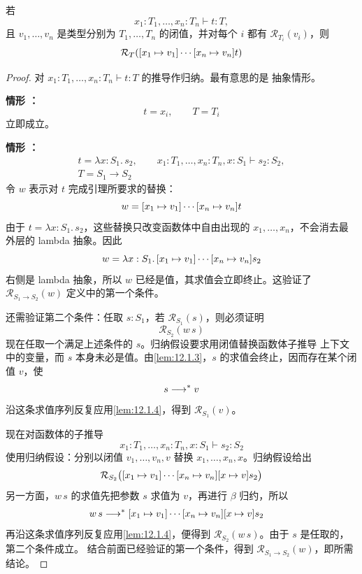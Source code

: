 \begin{lemma}
\label{lem:12.1.5}
若
\[
x_1:T_1,\ldots,x_n:T_n\vdash t:T,
\]
且 \(v_1,\ldots,v_n\) 是类型分别为 \(T_1,\ldots,T_n\) 的闭值，并对每个
\(i\) 都有 \(\mathcal R_{T_i}(v_i)\)，则
\[
\mathcal R_T(
  [x_1\mapsto v_1]\cdots
    [x_n\mapsto v_n]t)
\]
\end{lemma}

\begin{proof}
对 \(x_1:T_1,\ldots,x_n:T_n\vdash t:T\) 的推导作归纳。最有意思的是
抽象情形。

\medskip\noindent
\textbf{情形 ：}
\[
t=x_i,\qquad T=T_i
\]
立即成立。

\medskip\noindent
\textbf{情形 ：}
\[
\begin{gathered}
t=\lambda x:S_1.\,s_2,\qquad
x_1:T_1,\ldots,x_n:T_n,x:S_1\vdash s_2:S_2,\\
T=S_1\to S_2
\end{gathered}
\]
令 \(w\) 表示对 \(t\) 完成引理所要求的替换：
\[
w=
[x_1\mapsto v_1]\cdots
 [x_n\mapsto v_n]t
\]
由于 \(t=\lambda x:S_1.\,s_2\)，这些替换只改变函数体中自由出现的
\(x_1,\ldots,x_n\)，不会消去最外层的 lambda 抽象。因此
\[
w=
\lambda x:S_1.\,
[x_1\mapsto v_1]\cdots
 [x_n\mapsto v_n]s_2
\]
右侧是 lambda 抽象，所以 \(w\) 已经是值，其求值会立即终止。这验证了
\(\mathcal R_{S_1\to S_2}(w)\) 定义中的第一个条件。

还需验证第二个条件：任取 \(s:S_1\)，若
\(\mathcal R_{S_1}(s)\)，则必须证明
\[
\mathcal R_{S_2}(w\,s)
\]
现在任取一个满足上述条件的 \(s\)。归纳假设要求用闭值替换函数体子推导
上下文中的变量，而 \(s\) 本身未必是值。由\cref{lem:12.1.3}，\(s\)
的求值会终止，因而存在某个闭值 \(v\)，使
\[
s\mathrel{\longrightarrow^{*}} v
\]
沿这条求值序列反复应用\cref{lem:12.1.4}，得到
\(\mathcal R_{S_1}(v)\)。

现在对函数体的子推导
\[
x_1:T_1,\ldots,x_n:T_n,x:S_1\vdash s_2:S_2
\]
使用归纳假设：分别以闭值 \(v_1,\ldots,v_n,v\) 替换
\(x_1,\ldots,x_n,x\)。归纳假设给出
\[
\mathcal R_{S_2}\bigl(
[x_1\mapsto v_1]\cdots
 [x_n\mapsto v_n]
  [x\mapsto v]s_2\bigr)
\]
另一方面，\(w\,s\) 的求值先把参数 \(s\) 求值为 \(v\)，再进行
\(\beta\) 归约，所以
\[
\begin{aligned}
w\,s
&\mathrel{\longrightarrow^{*}}
[x_1\mapsto v_1]\cdots
 [x_n\mapsto v_n]
  [x\mapsto v]s_2
\end{aligned}
\]
再沿这条求值序列反复应用\cref{lem:12.1.4}，便得到
\(\mathcal R_{S_2}(w\,s)\)。由于 \(s\) 是任取的，第二个条件成立。
结合前面已经验证的第一个条件，得到
\(\mathcal R_{S_1\to S_2}(w)\)，即所需结论。


\end{proof}
